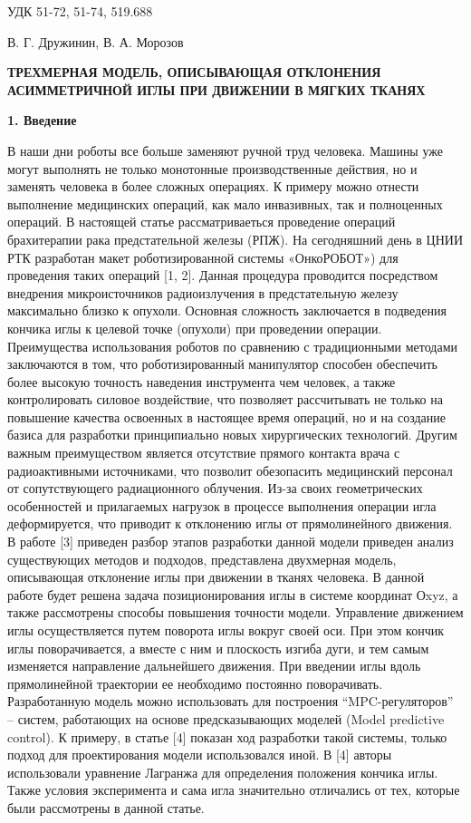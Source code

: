 \documentclass[10pt]{article}
\begin{document}
\large \noindent  УДК 51-72, 51-74, 519.688

\bigskip

 В. Г. Дружинин, В. А. Морозов
 
\begin{center}
\bf ТРЕХМЕРНАЯ МОДЕЛЬ, ОПИСЫВАЮЩАЯ ОТКЛОНЕНИЯ АСИММЕТРИЧНОЙ ИГЛЫ ПРИ ДВИЖЕНИИ В МЯГКИХ ТКАНЯХ
\end{center}

\bigskip
\textbf{1. Введение}

\bigskip
В наши дни роботы все больше заменяют ручной труд человека. Машины уже могут выполнять не только монотонные производственные действия, но и заменять человека в более сложных операциях. К примеру можно отнести выполнение медицинских операций, как мало инвазивных, так и полноценных операций.
В настоящей статье рассматриваеться проведение операций брахитерапии рака предстательной железы (РПЖ). На сегодняшний день в ЦНИИ РТК разработан макет роботизированной системы «ОнкоРОБОТ») для проведения таких операций [1, 2]. 
Данная процедура проводится посредством внедрения микроисточников радиоизлучения в предстательную железу максимально близко к опухоли. Основная сложность заключается в подведения кончика иглы к целевой точке (опухоли) при проведении операции.
Преимущества использования роботов по сравнению с традиционными методами заключаются в том, что роботизированный манипулятор способен обеспечить более высокую точность наведения инструмента чем человек, а также контролировать силовое воздействие, что позволяет рассчитывать не только на повышение качества освоенных в настоящее время операций, но и на создание базиса для разработки принципиально новых хирургических технологий. 
Другим важным преимуществом является отсутствие прямого контакта врача с радиоактивными источниками, что позволит обезопасить медицинский персонал от сопутствующего радиационного облучения.
Из-за своих геометрических особенностей и прилагаемых нагрузок в процессе выполнения операции игла деформируется, что приводит к отклонению иглы от прямолинейного движения. 
В работе [3] приведен разбор этапов разработки данной модели приведен анализ существующих методов и подходов, представлена двухмерная модель, описывающая отклонение иглы при движении в тканях человека. 
В данной работе будет решена задача позиционирования иглы в системе координат Оxyz, а также рассмотрены способы повышения точности модели. 
Управление движением иглы осуществляется путем поворота иглы вокруг своей оси. При этом кончик иглы поворачивается, а вместе с ним и плоскость изгиба дуги, 
и тем самым изменяется направление дальнейшего движения. При введении иглы вдоль прямолинейной траектории ее необходимо постоянно поворачивать.
Разработанную модель можно использовать для построения “MPC-регуляторов” – систем, работающих на основе предсказывающих моделей (Model predictive control).
К примеру, в статье [4] показан ход разработки такой системы, только подход для проектирования модели использовался иной. В [4] авторы использовали уравнение Лагранжа для определения положения кончика иглы. Также условия эксперимента и сама игла значительно отличались от тех, которые были рассмотрены в данной статье.
\end{document}
